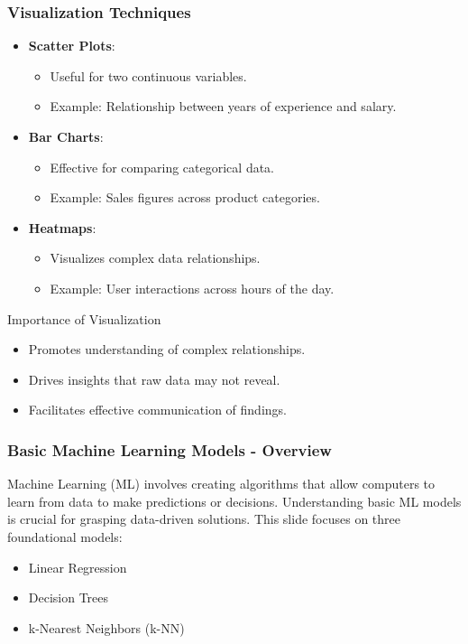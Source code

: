\documentclass[aspectratio=169]{beamer}
\begin{document}
\begin{frame}[fragile]
    \frametitle{Visualization Techniques}
    \begin{itemize}
        \item \textbf{Scatter Plots}:
        \begin{itemize}
            \item Useful for two continuous variables.
            \item Example: Relationship between years of experience and salary.
        \end{itemize}
        
        \item \textbf{Bar Charts}:
        \begin{itemize}
            \item Effective for comparing categorical data.
            \item Example: Sales figures across product categories.
        \end{itemize}

        \item \textbf{Heatmaps}:
        \begin{itemize}
            \item Visualizes complex data relationships.
            \item Example: User interactions across hours of the day.
        \end{itemize}
    \end{itemize}
    
    \begin{block}{Importance of Visualization}
        \begin{itemize}
            \item Promotes understanding of complex relationships.
            \item Drives insights that raw data may not reveal.
            \item Facilitates effective communication of findings.
        \end{itemize}
    \end{block}
\end{frame}

\begin{frame}[fragile]
    \frametitle{Basic Machine Learning Models - Overview}
    Machine Learning (ML) involves creating algorithms that allow computers to learn from data to make predictions or decisions. Understanding basic ML models is crucial for grasping data-driven solutions. This slide focuses on three foundational models:
    \begin{itemize}
        \item Linear Regression
        \item Decision Trees
        \item k-Nearest Neighbors (k-NN)
    \end{itemize}
\end{frame}
\end{document}

